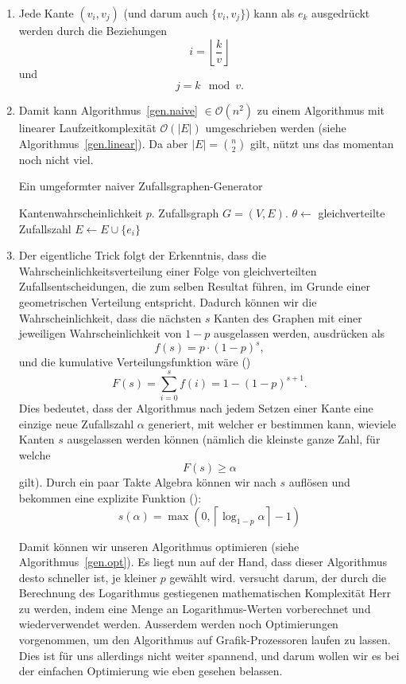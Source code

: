 \documentclass[11pt]{scrreprt} %
\theoremstyle{definition}
\begin{document}
\begin{enumerate}
\item Jede Kante $(v_i, v_j)$ (und darum auch $\{v_i, v_j\}$) kann als $e_k$ ausgedrückt werden durch die Beziehungen
\[
i = \left\lfloor\frac k v \right\rfloor
\]
und
\[
j = k \mod v.
\]

\item Damit kann Algorithmus~\ref{gen.naive} $\in \mathcal{O}(n^2)$ zu einem Algorithmus mit linearer Laufzeitkomplexität $\mathcal{O}(|E|)$ umgeschrieben werden (siehe Algorithmus~\ref{gen.linear}). Da aber $|E| = \binom{n}{2}$ gilt, nützt uns das momentan noch nicht viel.

\begin{algorithm}
\caption{Ein umgeformter naiver Zufallsgraphen-Generator}
\label{gen.linear}
\begin{algorithmic}
\Require
	\Statex Kantenwahrscheinlichkeit $p$.
\Ensure
	\Statex Zufallsgraph $G = (V, E)$.
\Statex
{}
\State $\theta\gets$ gleichverteilte Zufallszahl
\State $E \gets E \cup \{e_i\}$
\EndIf
\EndFor
\end{algorithmic}
\end{algorithm}

\item Der eigentliche Trick folgt der Erkenntnis, dass die Wahrscheinlichkeitsverteilung einer Folge von gleichverteilten Zufallsentscheidungen, die zum selben Resultat führen, im Grunde einer geometrischen Verteilung entspricht. Dadurch können wir die Wahrscheinlichkeit, dass die nächsten $s$ Kanten des Graphen mit einer jeweiligen Wahrscheinlichkeit von $1-p$ ausgelassen werden, ausdrücken als
\[
	f(s) = p \cdot (1-p)^s,
\]
und die kumulative Verteilungsfunktion wäre (\cite{fastalgo})
\[
	F(s) = \sum\limits_{i=0}^s f(i) = 1 - (1-p)^{s+1}.
\]
Dies bedeutet, dass der Algorithmus nach jedem Setzen einer Kante eine einzige neue Zufallszahl $\alpha$ generiert, mit welcher er bestimmen kann, wieviele Kanten $s$ ausgelassen werden können (nämlich die kleinste ganze Zahl, für welche
\[
F(s) \ge \alpha
\]
gilt). Durch ein paar Takte Algebra können wir nach $s$ auflösen und bekommen eine explizite Funktion (\cite{fastalgo}):
\[
	s(\alpha) = \max(0, \left\lceil \log_{1-p}\alpha\right\rceil - 1)
\]

Damit können wir unseren Algorithmus optimieren (siehe Algorithmus~\ref{gen.opt}). Es liegt nun auf der Hand, dass dieser Algorithmus desto schneller ist, je kleiner $p$ gewählt wird. \cite{fastalgo} versucht darum, der durch die Berechnung des Logarithmus gestiegenen mathematischen Komplexität Herr zu werden, indem eine Menge an Logarithmus-Werten vorberechnet und wiederverwendet werden. Ausserdem werden noch Optimierungen vorgenommen, um den Algorithmus auf Grafik-Prozessoren laufen zu lassen. Dies ist für uns allerdings nicht weiter spannend, und darum wollen wir es bei der einfachen Optimierung wie eben gesehen belassen.


\end{enumerate}
\end{document}
